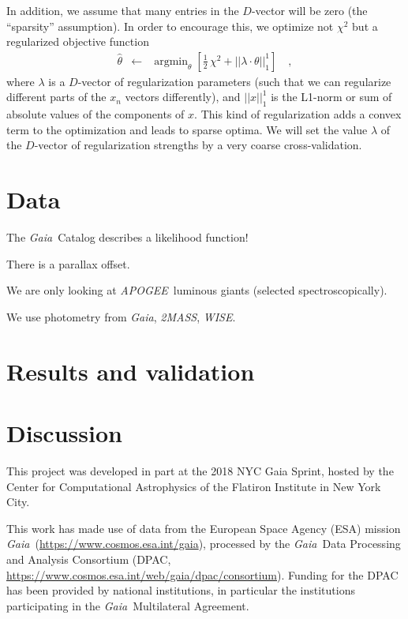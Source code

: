 \documentclass[modern]{aastex62}
\newcommand{\acronym}[1]{{\small{#1}}}
\newcommand{\project}[1]{\textsl{#1}}
\newcommand{\apogee}{\project{\acronym{APOGEE}}}
\newcommand{\gaia}{\project{Gaia}}
\newcommand{\wise}{\project{\acronym{WISE}}}
\newcommand{\zmass}{\project{\acronym{2MASS}}}
\DeclareMathOperator*{\argmin}{argmin}
\begin{document}
In addition, we assume that many entries in the $D$-vector will be zero
(the ``sparsity'' assumption).
In order to encourage this, we optimize not $\chi^2$ but a regularized objective function
\begin{eqnarray}
\hat{\theta} &\leftarrow& \argmin_{\theta}\left[\frac{1}{2}\,\chi^2 + ||\lambda\cdot\theta||_1^1\right]
\quad ,
\end{eqnarray}
where
$\lambda$ is a $D$-vector of regularization parameters (such that we can regularize
different parts of the $x_n$ vectors differently),
and $||x||_1^1$ is the L1-norm or sum of absolute values of the components of $x$.
This kind of regularization adds a convex term to the optimization and leads to
sparse optima.
We will set the value $\lambda$ of the $D$-vector of regularization strengths by a
very coarse cross-validation.

\section{Data}

The \gaia\ Catalog describes a likelihood function!

There is a parallax offset.

We are only looking at \apogee\ luminous giants (selected spectroscopically).

We use photometry from \gaia, \zmass, \wise.

\section{Results and validation}

\section{Discussion}

\acknowledgements
This project was developed in part at the
2018 \acronym{NYC} Gaia Sprint, hosted by the Center for Computational Astrophysics of
the Flatiron Institute in New York City.

This work has made use of data from the European Space Agency (ESA) mission
\gaia\ (\url{https://www.cosmos.esa.int/gaia}), processed by the \gaia\ Data
Processing and Analysis Consortium (\acronym{DPAC},
\url{https://www.cosmos.esa.int/web/gaia/dpac/consortium}). Funding for the
\acronym{DPAC}
has been provided by national institutions, in particular the institutions
participating in the \gaia\ Multilateral Agreement.
\end{document}
